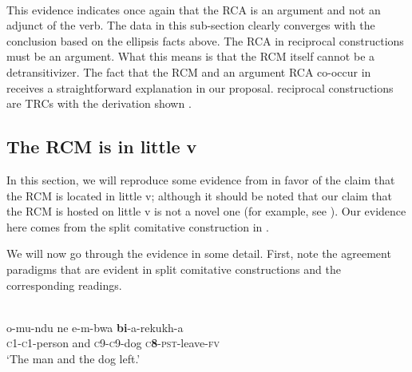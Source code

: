\documentclass[output=paper]{langsci/langscibook}
\begin{document}
\ea\label{ex:safir:19}
\settowidth{}
  \\
\z
\z
{}
This evidence indicates once again that the RCA is an argument and not an adjunct of the verb. The data in this sub-section clearly converges with the conclusion based on the ellipsis facts above. The RCA in  reciprocal constructions must be an argument. What this means is that the RCM itself cannot be a detransitivizer. The fact that the RCM and an argument RCA co-occur in  receives a straightforward explanation in our proposal.  reciprocal constructions are TRCs with the derivation shown . 

 
\subsection{The RCM is in little v}


In this section, we will reproduce some evidence from \citet{BakerEtAl2013} in favor of the claim that the RCM is located in little v; although it should be noted that our claim that the RCM is hosted on little v is not a novel one (for example, see \citealt{Bruening2006}). Our evidence here comes from the split comitative construction in . 

We will now go through the evidence in some detail. First, note the agreement paradigms that are evident in split comitative constructions and the corresponding readings. 


\ea\label{ex:safir:20}
\\
\ea\label{ex:safir:20a}
\gll   o-mu-ndu        ne   e-m-bwa  \textbf{{bi}}{-a-rekukh-a} \\
       \textsc{c1-c1}-person   and  \textsc{c9-c9}-dog   \textsc{c}\textbf{8}-\textsc{pst}-leave-\textsc{fv} \\
\glt   ‘The man and the dog left.’
\end{document}
